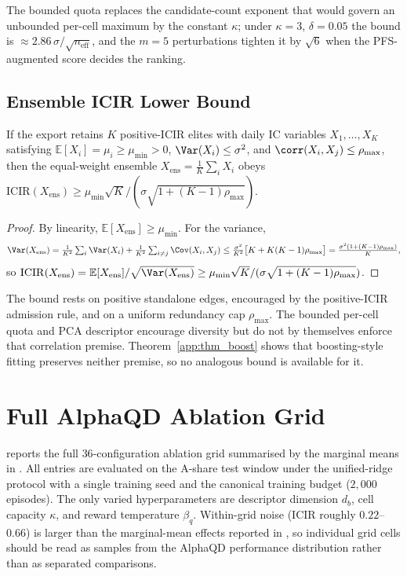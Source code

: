 The bounded quota replaces the candidate-count exponent that would govern an unbounded per-cell maximum by the constant $\kappa$; under $\kappa=3$, $\delta=0.05$ the bound is $\approx 2.86\,\sigma/\sqrt{n_{\mathrm{eff}}}$, and the $m=5$ perturbations tighten it by $\sqrt{6}$ when the PFS-augmented score decides the ranking.

\subsection{Ensemble ICIR Lower Bound}
\label{app:alphaqd_ensemble}

\begin{theorem}
\label{app:thm_ensemble}
If the export retains $K$ positive-ICIR elites with daily IC variables $X_1,\dots,X_K$ satisfying $\mathbb{E}[X_i]=\mu_i\ge\mu_{\min}>0$, $\Var(X_i)\le\sigma^2$, and $\corr(X_i,X_j)\le\rho_{\max}$, then the equal-weight ensemble $X_{\mathrm{ens}}=\frac{1}{K}\sum_i X_i$ obeys $\mathrm{ICIR}(X_{\mathrm{ens}})\ge\mu_{\min}\sqrt{K}/(\sigma\sqrt{1+(K-1)\rho_{\max}})$.
\end{theorem}
\begin{proof}
By linearity, $\mathbb{E}[X_{\mathrm{ens}}]\ge\mu_{\min}$. For the variance,
\[
\Var(X_{\mathrm{ens}}) = \tfrac{1}{K^2}\textstyle\sum_i\Var(X_i) + \tfrac{1}{K^2}\sum_{i\ne j}\Cov(X_i,X_j) \le \tfrac{\sigma^2}{K^2}\bigl[K+K(K-1)\rho_{\max}\bigr] = \tfrac{\sigma^2(1+(K-1)\rho_{\max})}{K},
\]
so $\mathrm{ICIR}(X_{\mathrm{ens}})=\mathbb{E}[X_{\mathrm{ens}}]/\sqrt{\Var(X_{\mathrm{ens}})}\ge\mu_{\min}\sqrt{K}/(\sigma\sqrt{1+(K-1)\rho_{\max}})$.
\end{proof}

The bound rests on positive standalone edges, encouraged by the positive-ICIR admission rule, and on a uniform redundancy cap $\rho_{\max}$. The bounded per-cell quota and PCA descriptor encourage diversity but do not by themselves enforce that correlation premise. Theorem~\ref{app:thm_boost} shows that boosting-style fitting preserves neither premise, so no analogous bound is available for it.

\section{Full AlphaQD Ablation Grid}
\label{app:alphaqd_ablation}

 reports the full $36$-configuration ablation grid summarised by the marginal means in . All entries are evaluated on the A-share test window under the unified-ridge protocol with a single training seed and the canonical training budget ($2{,}000$ episodes). The only varied hyperparameters are descriptor dimension $d_b$, cell capacity $\kappa$, and reward temperature $\beta_q$. Within-grid noise (ICIR roughly $0.22$--$0.66$) is larger than the marginal-mean effects reported in , so individual grid cells should be read as samples from the AlphaQD performance distribution rather than as separated comparisons.

